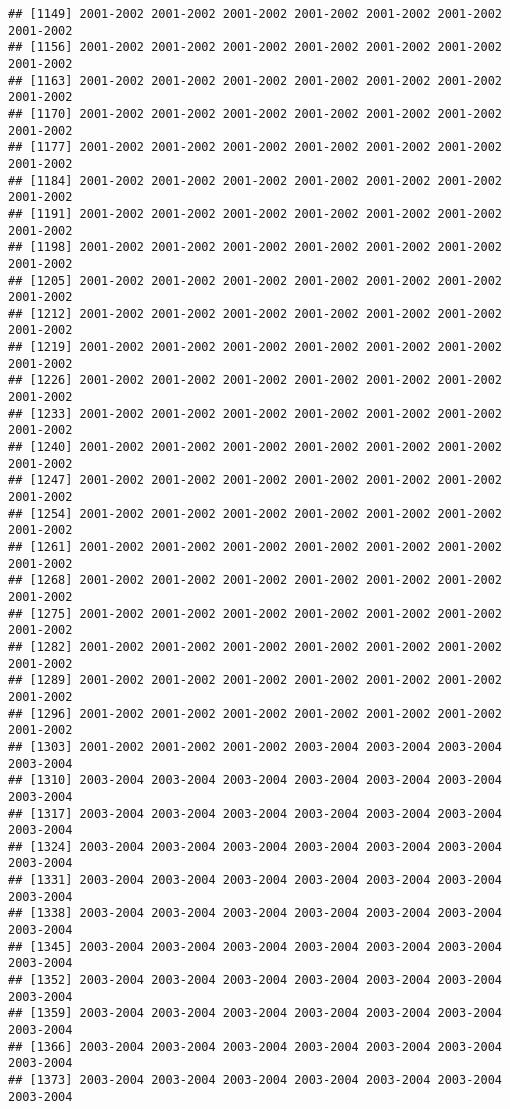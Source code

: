 \documentclass[
]{article}
\begin{document}
\begin{verbatim}
## [1149] 2001-2002 2001-2002 2001-2002 2001-2002 2001-2002 2001-2002 2001-2002
## [1156] 2001-2002 2001-2002 2001-2002 2001-2002 2001-2002 2001-2002 2001-2002
## [1163] 2001-2002 2001-2002 2001-2002 2001-2002 2001-2002 2001-2002 2001-2002
## [1170] 2001-2002 2001-2002 2001-2002 2001-2002 2001-2002 2001-2002 2001-2002
## [1177] 2001-2002 2001-2002 2001-2002 2001-2002 2001-2002 2001-2002 2001-2002
## [1184] 2001-2002 2001-2002 2001-2002 2001-2002 2001-2002 2001-2002 2001-2002
## [1191] 2001-2002 2001-2002 2001-2002 2001-2002 2001-2002 2001-2002 2001-2002
## [1198] 2001-2002 2001-2002 2001-2002 2001-2002 2001-2002 2001-2002 2001-2002
## [1205] 2001-2002 2001-2002 2001-2002 2001-2002 2001-2002 2001-2002 2001-2002
## [1212] 2001-2002 2001-2002 2001-2002 2001-2002 2001-2002 2001-2002 2001-2002
## [1219] 2001-2002 2001-2002 2001-2002 2001-2002 2001-2002 2001-2002 2001-2002
## [1226] 2001-2002 2001-2002 2001-2002 2001-2002 2001-2002 2001-2002 2001-2002
## [1233] 2001-2002 2001-2002 2001-2002 2001-2002 2001-2002 2001-2002 2001-2002
## [1240] 2001-2002 2001-2002 2001-2002 2001-2002 2001-2002 2001-2002 2001-2002
## [1247] 2001-2002 2001-2002 2001-2002 2001-2002 2001-2002 2001-2002 2001-2002
## [1254] 2001-2002 2001-2002 2001-2002 2001-2002 2001-2002 2001-2002 2001-2002
## [1261] 2001-2002 2001-2002 2001-2002 2001-2002 2001-2002 2001-2002 2001-2002
## [1268] 2001-2002 2001-2002 2001-2002 2001-2002 2001-2002 2001-2002 2001-2002
## [1275] 2001-2002 2001-2002 2001-2002 2001-2002 2001-2002 2001-2002 2001-2002
## [1282] 2001-2002 2001-2002 2001-2002 2001-2002 2001-2002 2001-2002 2001-2002
## [1289] 2001-2002 2001-2002 2001-2002 2001-2002 2001-2002 2001-2002 2001-2002
## [1296] 2001-2002 2001-2002 2001-2002 2001-2002 2001-2002 2001-2002 2001-2002
## [1303] 2001-2002 2001-2002 2001-2002 2003-2004 2003-2004 2003-2004 2003-2004
## [1310] 2003-2004 2003-2004 2003-2004 2003-2004 2003-2004 2003-2004 2003-2004
## [1317] 2003-2004 2003-2004 2003-2004 2003-2004 2003-2004 2003-2004 2003-2004
## [1324] 2003-2004 2003-2004 2003-2004 2003-2004 2003-2004 2003-2004 2003-2004
## [1331] 2003-2004 2003-2004 2003-2004 2003-2004 2003-2004 2003-2004 2003-2004
## [1338] 2003-2004 2003-2004 2003-2004 2003-2004 2003-2004 2003-2004 2003-2004
## [1345] 2003-2004 2003-2004 2003-2004 2003-2004 2003-2004 2003-2004 2003-2004
## [1352] 2003-2004 2003-2004 2003-2004 2003-2004 2003-2004 2003-2004 2003-2004
## [1359] 2003-2004 2003-2004 2003-2004 2003-2004 2003-2004 2003-2004 2003-2004
## [1366] 2003-2004 2003-2004 2003-2004 2003-2004 2003-2004 2003-2004 2003-2004
## [1373] 2003-2004 2003-2004 2003-2004 2003-2004 2003-2004 2003-2004 2003-2004

\end{verbatim}
\end{document}
